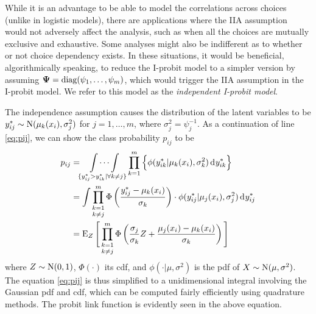 While it is an advantage to be able to model the correlations across choices (unlike in logistic models), there are applications where the IIA assumption would not adversely affect the analysis, such as when all the choices are mutually exclusive and exhaustive.
Some analyses might also be indifferent as to whether or not choice dependency exists.
In these situations, it would be beneficial, algorithmically speaking, to reduce the I-probit model to a simpler version by assuming ${\bm\Psi} = \operatorname{diag}(\psi_1,\dots,\psi_m)$, which would trigger the IIA assumption in the I-probit model.
We refer to this model as the \emph{independent I-probit model}.

The independence assumption causes the distribution of the latent variables to be $y_{ij}^* \sim \operatorname{N}(\mu_k(x_i), \sigma_j^2)$ for $j=1,\dots,m$, where $\sigma_j^2 = \psi_j^{-1}$.
As a continuation of line \cref{eq:pij}, we can show the class probability $p_{ij}$ to be
\begin{align}
  p_{ij} 
  &= \idotsint\displaylimits_{\{y_{ij}^* > y_{ik}^* | \forall k \neq j\}} 
  \prod_{k=1}^m \Big\{ \phi(y_{ik}^*|\mu_k(x_i), \sigma_k^2) \operatorname{d}\hspace{0.5pt}\! y_{ik}^* \Big\} \nonumber \\
  &= \int \mathop{\prod_{k=1}^m}_{k\neq j} 
  \Phi \left( \frac{y_{ij}^* - \mu_k(x_i)}{\sigma_k} \right) \cdot
   \phi(y_{ij}^*|\mu_j(x_i), \sigma_j^2)  \operatorname{d}\hspace{0.5pt}\! y_{ij}^* \nonumber \\
  &= \operatorname{E}_Z \Bigg[ \mathop{\prod_{k=1}^m}_{k\neq j} 
  \Phi \left(\frac{\sigma_j}{\sigma_k} Z + \frac{\mu_j(x_i) - \mu_k(x_i)}{\sigma_k} \right) \Bigg] \label{eq:pij2}
\end{align}
where $Z\sim\operatorname{N}(0,1)$, $\Phi(\cdot)$ its cdf, and $\phi(\cdot|\mu,\sigma^2)$ is the pdf of $X\sim\operatorname{N}(\mu,\sigma^2)$.
The equation \cref{eq:pij} is thus simplified to a unidimensional integral involving the Gaussian pdf and cdf, which can be computed fairly efficiently using quadrature methods.
The probit link function is evidently seen in the above equation.
